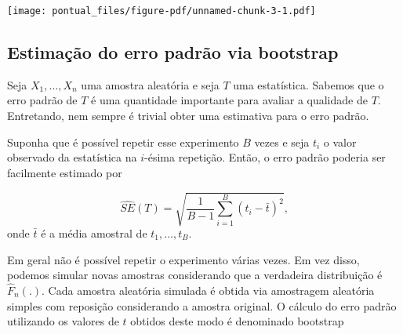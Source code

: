 \documentclass[
  letterpaper,
  DIV=11,
  numbers=noendperiod]{scrartcl}
\newenvironment{Shaded}{\begin{snugshade}}{\end{snugshade}}
\newcommand{\AttributeTok}[1]{\textcolor[rgb]{0.40,0.45,0.13}{#1}}
\newcommand{\ControlFlowTok}[1]{\textcolor[rgb]{0.00,0.23,0.31}{#1}}
\newcommand{\DecValTok}[1]{\textcolor[rgb]{0.68,0.00,0.00}{#1}}
\newcommand{\FunctionTok}[1]{\textcolor[rgb]{0.28,0.35,0.67}{#1}}
\newcommand{\NormalTok}[1]{\textcolor[rgb]{0.00,0.23,0.31}{#1}}
\newcommand{\OtherTok}[1]{\textcolor[rgb]{0.00,0.23,0.31}{#1}}
\newcommand{\SpecialCharTok}[1]{\textcolor[rgb]{0.37,0.37,0.37}{#1}}
\newcommand{\StringTok}[1]{\textcolor[rgb]{0.13,0.47,0.30}{#1}}
\begin{document}
\begin{Shaded}
\end{Shaded}

\texttt{[image: pontual\_files/figure-pdf/unnamed-chunk-3-1.pdf]}

\subsection{Estimação do erro padrão via
bootstrap}\label{estimauxe7uxe3o-do-erro-padruxe3o-via-bootstrap}

Seja \(X_1,\ldots,X_n\) uma amostra aleatória e seja \(T\) uma
estatística. Sabemos que o erro padrão de \(T\) é uma quantidade
importante para avaliar a qualidade de \(T\). Entretando, nem sempre é
trivial obter uma estimativa para o erro padrão.

Suponha que é possível repetir esse experimento \(B\) vezes e seja
\(t_i\) o valor observado da estatística na \(i\)-ésima repetição.
Então, o erro padrão poderia ser facilmente estimado por

\[\widehat{SE}(T)=\sqrt{\frac{1}{B-1}\sum_{i=1}^B(t_i-\bar{t})^2},\]
onde \(\bar{t}\) é a média amostral de \(t_1,\ldots,t_B\).

Em geral não é possível repetir o experimento várias vezes. Em vez
disso, podemos simular novas amostras considerando que a verdadeira
distribuição é \(\hat{F}_n(.)\). Cada amostra aleatória simulada é
obtida via amostragem aleatória simples com reposição considerando a
amostra original. O cálculo do erro padrão utilizando os valores de
\(t\) obtidos deste modo é denominado bootstrap
\end{document}
